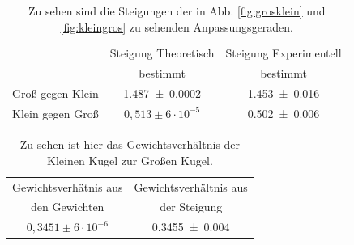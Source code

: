\begin{table}[h]
	\begin{tabular}{|c|c|c|}
		\hline
		& Steigung Theoretisch & Steigung Experimentell\\
		& bestimmt & bestimmt\\
		\hline
		Groß gegen Klein &  \SI{1,487+-0,0002}{} & \SI{1,453+-0,016}{} \\
		\hline
		Klein gegen Groß & $0,513 \pm 6 \cdot 10^{-5}$&\SI{0,502+-0,006}{}\\
		\hline
	\end{tabular}
\caption{Zu sehen sind die Steigungen der in Abb. \ref{fig:grosklein} und \ref{fig:kleingros} zu sehenden Anpassungsgeraden.}
\label{tab:steigung}
\end{table}
\begin{table}[h]
	\begin{tabular}{|c|c|}
		\hline
		Gewichtsverhätnis aus  & Gewichtsverhältnis aus\\
		 den Gewichten & der Steigung\\
		\hline
		$0,3451 \pm 6 \cdot 10^{-6}$& \SI{0,3455+-0,004}{}\\
		\hline
	\end{tabular}
	\caption{Zu sehen ist hier das Gewichtsverhältnis der Kleinen Kugel zur Großen Kugel.}
	\label{tab:Gewicht}
\end{table}
